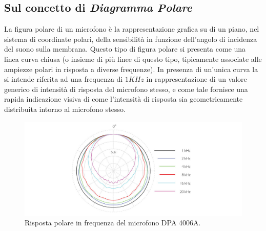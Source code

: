 \subsection{Sul concetto di \emph{Diagramma Polare}}
\label{sec:polarplot}

La figura polare di un microfono è la rappresentazione grafica su di un piano,
nel sistema di coordinate polari, della sensibilità in funzione dell'angolo di
incidenza del suono sulla membrana. Questo tipo di figura polare si presenta
come una linea curva chiusa (o insieme di più linee di questo tipo, tipicamente
associate alle ampiezze polari in risposta a diverse frequenze). In presenza di
un’unica curva la si intende riferita ad una frequenza di $1KHz$ in rappresentazione
di un valore generico di intensità di risposta del microfono stesso,
e come tale fornisce una rapida indicazione visiva di come l'intensità di
risposta sia geometricamente distribuita intorno
al microfono stesso.

\begin{figure}[h]
\centering
\includegraphics[width=1\columnwidth]{CAPITOLI/1000/IMG/4006A-ddicate-4006A-Omni-Microphone-polar-pattern.jpg}
\caption{Risposta polare in frequenza del microfono DPA 4006A.}%
\label{pol:dpa4006}
\end{figure}

